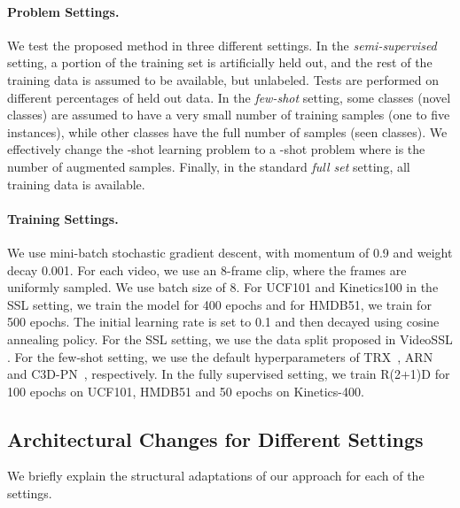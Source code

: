 \documentclass[runningheads]{llncs}
\begin{document}
\paragraph{Problem Settings.} We test the proposed method in three different settings. In the \emph{semi-supervised} setting, a portion of the training set is artificially held out, and the rest of the training data is assumed to be available, but unlabeled. Tests are performed on different percentages of held out data. In the \emph{few-shot} setting, some classes (novel classes) are assumed to have a very small number of training samples (one to five instances), while other classes have the full number of samples (seen classes). We effectively change the -shot learning problem to a -shot problem where  is the number of augmented samples. 
Finally, in the standard \emph{full set} setting, all training data is available. 






\paragraph{Training Settings.} We use mini-batch stochastic gradient descent, with momentum of 0.9 and weight decay 0.001. For each video, we use an 8-frame clip, where the frames are uniformly sampled. We use batch size of 8. For UCF101 and Kinetics100 in the SSL setting, we train the model for 400 epochs and for HMDB51, we train for 500 epochs. The initial learning rate is set to 0.1 and then decayed using cosine annealing policy. For the SSL setting, we use the data split proposed in VideoSSL \cite{Jing_2021_WACV}. For the few-shot setting, we use the default hyperparameters of TRX~\cite{trx}, ARN~\cite{arn} and C3D-PN~\cite{pn}, respectively. In the fully supervised setting, we train R(2+1)D for 100 epochs on UCF101, HMDB51 and 50 epochs on Kinetics-400.













\subsection{Architectural Changes for Different Settings}

We briefly explain the structural adaptations of our approach for each of the settings.
\end{document}
